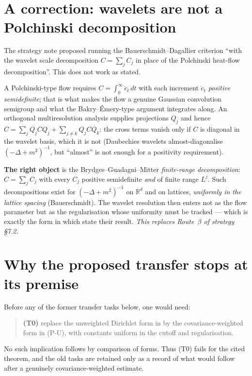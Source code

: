 \documentclass[11pt,a4paper]{article}
\theoremstyle{plain}
\theoremstyle{definition}
\newcommand{\R}{\mathbb{R}}
\begin{document}
\section{A correction: wavelets are not a Polchinski decomposition}\label{sec:corr}

The strategy note proposed running the Bauerschmidt--Dagallier criterion ``with the wavelet scale
decomposition $C=\sum_jC_j$ in place of the Polchinski heat-flow decomposition''. This does not
work as stated.

A Polchinski-type flow requires $C=\int_0^\infty\dot c_t\,dt$ with each increment $\dot c_t$
\emph{positive semidefinite}; that is what makes the flow a genuine Gaussian convolution
semigroup and what the Bakry--\'Emery-type argument integrates along. An orthogonal
multiresolution analysis supplies projections $Q_j$ and hence
$C=\sum_jQ_jCQ_j+\sum_{j\ne k}Q_jCQ_k$: the cross terms vanish only if $C$ is diagonal in the
wavelet basis, which it is not (Daubechies wavelets almost-diagonalise $(-\Delta+m^2)^{-1}$, but
``almost'' is not enough for a positivity requirement).

\medskip
\noindent\textbf{The right object} is the Brydges--Guadagni--Mitter \emph{finite-range
decomposition}: $C=\sum_jC_j$ with every $C_j$ positive semidefinite \emph{and} of finite range
$L^j$. Such decompositions exist for $(-\Delta+m^2)^{-1}$ on $\R^d$ and on lattices,
\emph{uniformly in the lattice spacing} (Bauerschmidt). The wavelet resolution then enters not as
the flow parameter but as the regularisation whose uniformity must be tracked --- which is exactly
the form in which \cite{BD} state their result. \emph{This replaces Route~$\beta$ of strategy
\S7.2.}

\section{Why the proposed transfer stops at its premise}\label{sec:transfer}

Before any of the former transfer tasks below, one would need:
\begin{quote}
\textbf{(T0)} replace the unweighted Dirichlet form in \cite{BD} by the covariance-weighted form
in (P-U), with constants uniform in the cutoff and regularisation.
\end{quote}
No such implication follows by comparison of forms.  Thus (T0) fails for the cited theorem, and
the old tasks are retained only as a record of what would follow after a genuinely
covariance-weighted estimate.
\end{document}
